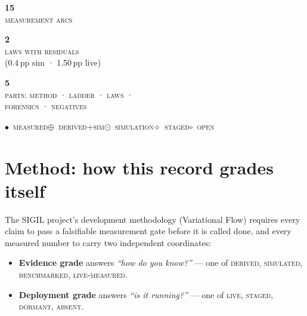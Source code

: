 \documentclass[10pt,a4paper]{article}
\newcommand{\stM}{\textcolor{sigilcyan}{$\bullet$}~{\scriptsize\textcolor{sigilcyan}{\textsc{measured}}}}
\newcommand{\stS}{\textcolor{sigilblue}{$\odot$}~{\scriptsize\textcolor{sigilblue}{\textsc{simulation}}}}
\newcommand{\stD}{\textcolor{sigilblue}{$\oplus$}~{\scriptsize\textcolor{sigilblue}{\textsc{derived+sim}}}}
\newcommand{\stG}{\textcolor{sigilviolet}{$\diamond$}~{\scriptsize\textcolor{sigilviolet}{\textsc{staged}}}}
\newcommand{\stO}{\textcolor{sigilamber}{$\circ$}~{\scriptsize\textcolor{sigilamber}{\textsc{open}}}}
\newcommand{\stC}{{\scriptsize\textcolor{gray}{$\triangle$~\textit{conjectural}}}}
\begin{document}
\vspace{4pt}
\begin{center}
\begin{minipage}[t]{0.30\textwidth}\centering
{\Large\bfseries 15}\\{\scriptsize\textsc{measurement arcs}}
\end{minipage}%
\begin{minipage}[t]{0.30\textwidth}\centering
{\Large\bfseries 2}\\{\scriptsize\textsc{laws with residuals}\\[-1pt]\scriptsize (0.4\,pp sim · 1.50\,pp live)}
\end{minipage}%
\begin{minipage}[t]{0.30\textwidth}\centering
{\Large\bfseries 5}\\{\scriptsize\textsc{parts: method · ladder · laws ·}\\[-1pt]\scriptsize\textsc{forensics · negatives}}
\end{minipage}
\end{center}

\vspace{4pt}
\begin{center}
\small
\stM\quad\stD\quad\stS\quad\stG\quad\stO\quad\stC
\end{center}

\clearpage

\section{Method: how this record grades itself}
\label{sec:method}

\noindent The SIGIL project's development methodology (Variational Flow) requires every
claim to pass a falsifiable measurement gate before it is called done, and every measured
number to carry two independent coordinates:

\begin{itemize}[leftmargin=1.4em,itemsep=2pt]
\item \textbf{Evidence grade} answers \emph{``how do you know?''} --- one of
  \textsc{derived}, \textsc{simulated}, \textsc{benchmarked}, \textsc{live-measured}.
\item \textbf{Deployment grade} answers \emph{``is it running?''} --- one of
  \textsc{live}, \textsc{staged}, \textsc{dormant}, \textsc{absent}.
\end{itemize}
\end{document}
